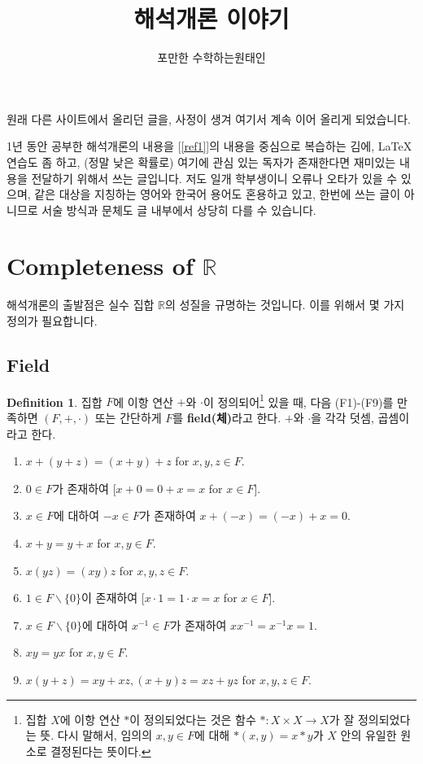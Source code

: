 \documentclass[12pt]{article}
\title{해석개론 이야기}
\author{포만한 수학하는원태인}
\theoremstyle{definition}
\newtheorem{defn}[thm]{Definition}
\def\RR{\mathbb{R}}
\begin{document}
\maketitle

\tableofcontents
\newpage

원래 다른 사이트에서 올리던 글을, 사정이 생겨 여기서 계속 이어 올리게 되었습니다.

1년 동안 공부한 해석개론의 내용을 [\ref{ref1}]\과 [\ref{ref2}]의 내용을 중심으로 복습하는 김에, {\LaTeX} 연습도 좀 하고, (정말 낮은 확률로) 여기에 관심 있는 독자가 존재한다면 재미있는 내용을 전달하기 위해서 쓰는 글입니다. 저도 일개 학부생이니 오류나 오타가 있을 수 있으며, 같은 대상을 지칭하는 영어와 한국어 용어도 혼용하고 있고, 한번에 쓰는 글이 아니므로 서술 방식과 문체도 글 내부에서 상당히 다를 수 있습니다.

\section{Completeness of \(\RR\)}

해석개론의 출발점은 실수 집합 \(\RR\)의 성질을 규명하는 것입니다. 이를 위해서 몇 가지 정의가 필요합니다.

\subsection{Field}

	\begin{defn}
		집합 \(F\)에 이항 연산 \(+\)와 \(\cdot\)이 정의되어\footnote{집합 \(X\)에 이항 연산 \(*\)이 정의되었다는 것은 함수 \(*: X \times X \rightarrow X\)가 잘 정의되었다는 뜻. 다시 말해서, 임의의 \(x, y \in F\)에 대해 \(*(x, y) = x * y\)가 \(X\) 안의 유일한 원소로 결정된다는 뜻이다.} 있을 때, 다음 (F1)-(F9)를 만족하면 \((F, +, \cdot)\) 또는 간단하게 \(F\)를 \textbf{field(체)}라고 한다. \(+\)와 \(\cdot\)을 각각 덧셈, 곱셈이라고 한다.
		\begin{enumerate} [label=(F\arabic*), leftmargin=2\parindent]
			\item
			\(x + (y+z) = (x+y)+z\) for \(x, y, z \in F\).
			\item
			\(0 \in F\)가 존재하여 [\(x+0=0+x=x\) for \(x \in F\)].
			\item
			\(x \in F\)에 대하여 \(-x \in F\)가 존재하여 \mbox{\(x+(-x)=(-x)+x=0\).}
			\item
			\(x+y=y+x\) for \(x, y \in F\).
			\item
			\(x(yz)=(xy)z\) for \(x, y, z \in F\).
			\item
			\(1 \in F \backslash \{0\}\)이 존재하여 [\(x\cdot 1=1 \cdot x=x\) for \(x \in F\)].
			\item
			\(x \in F \backslash \{0\}\)에 대하여 \(x^{-1} \in F\)가 존재하여 \(xx^{-1}=x^{-1}x=1\).
			\item
			\(xy=yx\) for \(x, y \in F\).
			\item
			\(x(y+z)=xy+xz, (x+y)z = xz+yz\) for \(x, y, z \in F\).
		\end{enumerate}
	\end{defn}
	
\end{document}
